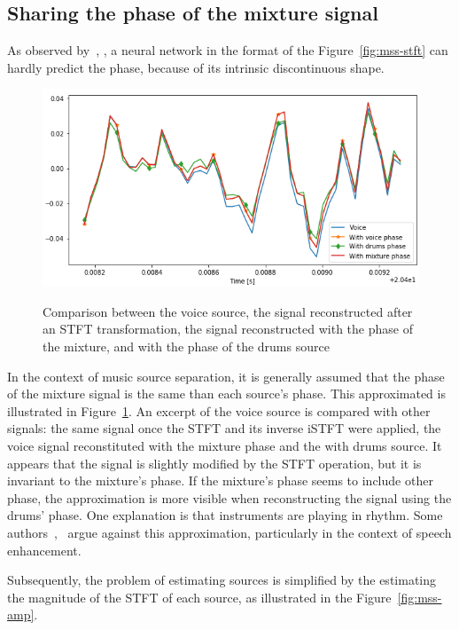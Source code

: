 \subsection{Sharing the phase of the mixture signal}

As observed by~\cite{chandna2017monoaural}, \cite{jansson2017singing},
a neural network in the format of the Figure~\ref{fig:mss-stft} can hardly
predict the phase, because of its intrinsic discontinuous shape.

\begin{figure}
  \centering
  \includegraphics[width=0.9\columnwidth]{approx-phase}
  \label{fig:approx-phase}
  \caption{Comparison between the voice source, the signal reconstructed after an STFT transformation, the signal reconstructed with the phase of the mixture, and with the phase of the drums source}
\end{figure}

In the context of music source separation, it is generally assumed
that the phase of the mixture signal is the same than each source's phase.
This approximated is illustrated in Figure~\ref{fig:approx-phase}. An excerpt of the voice source is compared with other signals: the same signal once the STFT and its inverse iSTFT were applied, the voice signal reconstituted with the mixture phase and the with drums source. It appears that the signal is slightly modified by the STFT operation, but it is invariant to the mixture's phase. If the mixture's phase seems to include other phase, the approximation is more visible when reconstructing the signal using the drums' phase.
One explanation is that instruments are playing in rhythm.
Some authors~\cite{mowlaee2015harmonic},~\cite{gerkmann2015phase} argue against this approximation, particularly in the context of speech enhancement.

Subsequently, the problem of estimating sources is simplified by the estimating the magnitude of the STFT of each source, as illustrated in the Figure~\ref{fig:mss-amp}.


